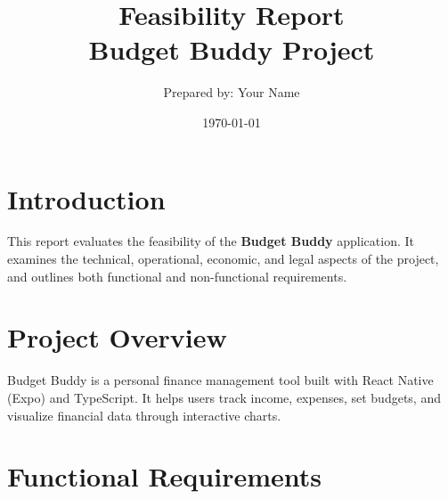 \documentclass[12pt,a4paper]{article}
\title{\textbf{Feasibility Report}\\[0.5em]
       \large Budget Buddy Project}
\author{Prepared by: Your Name}
\date{\today}
\begin{document}
\maketitle
\tableofcontents
\newpage

\section{Introduction}
This report evaluates the feasibility of the \textbf{Budget Buddy} application. It examines the technical, operational, economic, and legal aspects of the project, and outlines both functional and non-functional requirements.

\section{Project Overview}
Budget Buddy is a personal finance management tool built with React Native (Expo) and TypeScript. It helps users track income, expenses, set budgets, and visualize financial data through interactive charts.

\section{Functional Requirements}
\end{document}
